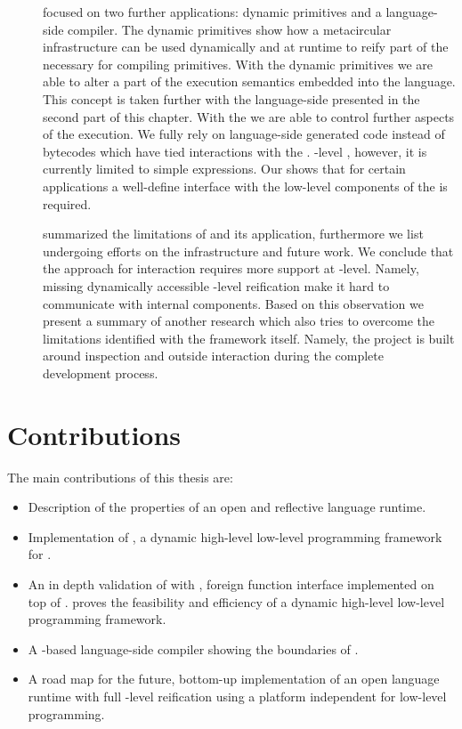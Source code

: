 \begin{description}
\item[] focused on two further \B applications: dynamic primitives and a language-side \JIT compiler.
	The dynamic primitives show how a metacircular infrastructure can be used dynamically and at runtime to reify part of the \VM necessary for compiling primitives.
	With the dynamic primitives we are able to alter a part of the execution semantics embedded into the language.
	This concept is taken further with the language-side \JIT presented in the second part of this chapter.
	With the \JIT we are able to control further aspects of the execution.
	We fully rely on language-side generated code instead of bytecodes which have tied interactions with the \VM.
	\VM-level \JIT, however, it is currently limited to simple expressions.
	Our \JIT shows that for certain applications a well-define interface with the low-level components of the \VM is required.

\item[] summarized the limitations of \B and its application, furthermore we list undergoing efforts on the \B infrastructure and future work.
	We conclude that the \B approach for \VM interaction requires more support at \VM-level.
	Namely, missing dynamically accessible \VM-level reification make it hard to communicate with \VM internal components.
	Based on this observation we present a summary of another research \VM which also tries to overcome the limitations identified with the \B framework itself.
	Namely, the project is built around inspection and outside interaction during the complete development process.	
\end{description}

\section{Contributions}
The main contributions of this thesis are:
%
\begin{itemize}
	\item Description of the properties of an open and reflective language runtime.
	
	\item Implementation of \B, a dynamic high-level low-level programming framework for \PH.
	
	\item An in depth validation of \B with \NB, foreign function interface  implemented on top of \B.
	\NB proves the feasibility and efficiency of a dynamic high-level low-level programming framework.
	
	\item A \B-based language-side \JIT compiler showing the boundaries of \B.
	
	\item A road map for the future, bottom-up implementation of an open language runtime with full \VM-level reification using a platform independent \IR for low-level programming.
\end{itemize}


